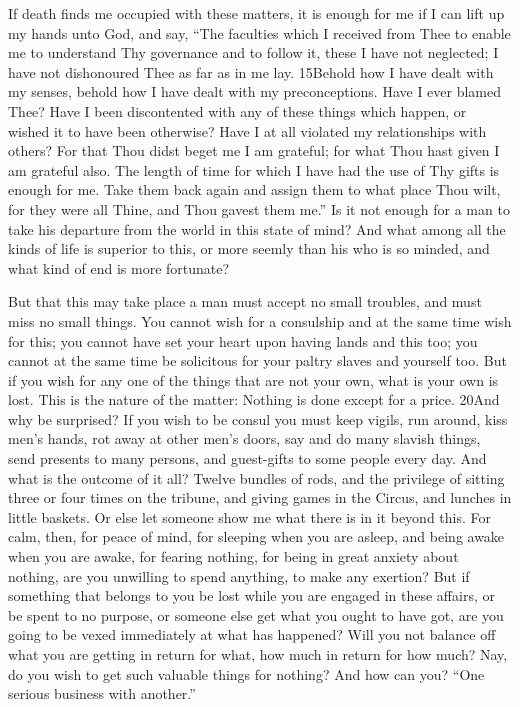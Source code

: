 If death finds me occupied with these matters, it is enough for me if I can lift up my hands unto God, and say, ``The faculties which I received from Thee to enable me to understand Thy governance and to follow it, these I have not neglected; I have not dishonoured Thee as far as in me lay. 15Behold how I have dealt with my senses, behold how I have dealt with my preconceptions. Have I ever blamed Thee? Have I been discontented with any of these things which happen, or wished it to have been otherwise? Have I at all violated my relationships with others? For that Thou didst beget me I am grateful; for what Thou hast given I am grateful also. The length of time for which I have had the use of Thy gifts is enough for me. Take them back again and assign them to what place Thou wilt, for they were all Thine, and Thou gavest them me.'' Is it not enough for a man to take his departure from the world in this state of mind? And what among all the kinds of life is superior to this, or more seemly than his who is so minded, and what kind of end is more fortunate?

But that this may take place a man must accept no small troubles, and must miss no small things. You cannot wish for a consulship and at the same time wish for this; you cannot have set your heart upon having lands and this too; you cannot at the same time be solicitous for your paltry slaves and yourself too. But if you wish for any one of the things that are not your own, what is your own is lost. This is the nature of the matter: Nothing is done except for a price. 20And why be surprised? If you wish to be consul you must keep vigils, run around, kiss men's hands, rot away at other men's doors, say and do many slavish things, send presents to many persons, and guest-gifts to some people every day. And what is the outcome of it all? Twelve bundles of rods, and the privilege of sitting three or four times on the tribune, and giving games in the Circus, and lunches in little baskets. Or else let someone show me what there is in it beyond this. For calm, then, for peace of mind, for sleeping when you are asleep, and being awake when you are awake, for fearing nothing, for being in great anxiety about nothing, are you unwilling to spend anything, to make any exertion? But if something that belongs to you be lost while you are engaged in these affairs, or be spent to no purpose, or someone else get what you ought to have got, are you going to be vexed immediately at what has happened? Will you not balance off what you are getting in return for what, how much in return for how much? Nay, do you wish to get such valuable things for nothing? And how can you? ``One serious business with another.''


